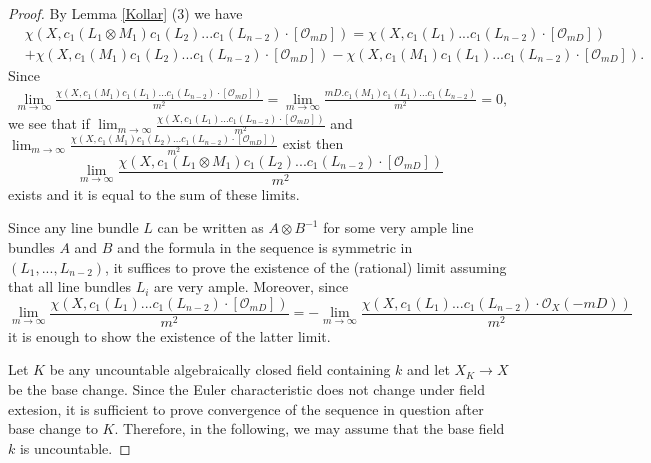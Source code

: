 \documentclass[twoside, 11pt]{article}
\theoremstyle{plain}
\theoremstyle{definition}
\theoremstyle{remark}
\newcommand{\cO}{{\mathcal O}}
\begin{document}
\begin{proof}
 By Lemma \ref{Kollar} (3) we have
\begin{align*}
&{  \chi (X, c_1(L_1\otimes M_1)c_1(L_2)...c_1(L_{n-2}) \cdot [\cO_{mD}] ) }
={  \chi (X, c_1(L_1)...c_1(L_{n-2}) \cdot [\cO_{mD}] ) }\\
&+ {  \chi (X, c_1(M_1)c_1(L_2)...c_1(L_{n-2}) \cdot [\cO_{mD}] ) }- 
 {  \chi (X, c_1(M_1)c_1(L_1)...c_1(L_{n-2}) \cdot [\cO_{mD}] ) }.
\end{align*}
Since
\begin{align*}
\lim _{m\to \infty}\frac{\chi (X,  c_1(M_1)c_1(L_1)...c_1(L_{n-2}) \cdot [\cO_{mD}])}{m^2}
=\lim _{m\to \infty}\frac{m D.  c_1(M_1)c_1(L_1)...c_1(L_{n-2} )}{m^2}=0,
\end{align*}
we see that if  $\lim _{m\to \infty }\frac {  \chi (X, c_1(L_1)...c_1(L_{n-2}) \cdot [\cO_{mD}] ) }{m^2} $ and 
$\lim _{m\to \infty }\frac {  \chi (X, c_1(M_1)c_1(L_2)...c_1(L_{n-2}) \cdot [\cO_{mD}] ) }{m^2}$
exist then $$\lim _{m\to \infty }\frac {  \chi (X, c_1(L_1\otimes M_1)c_1(L_2)...c_1(L_{n-2}) \cdot [\cO_{mD}] ) }{m^2}$$
exists and it is equal to the sum of these limits.

Since any line bundle $L$ can be written as $A\otimes B^{-1}$ for some very ample line bundles $A$ and $B$ and the formula in the sequence is symmetric in $(L_1, ..., L_{n-2})$, it suffices to prove the existence of the (rational) limit assuming that all line bundles $L_i$ are very ample. Moreover, since 
$$\lim _{m\to \infty } \frac {  \chi (X, c_1(L_1)...c_1(L_{n-2}) \cdot [\cO_{mD} ]) }{m^2}=
-\lim _{m\to \infty }\frac {  \chi (X, c_1(L_1)...c_1(L_{n-2}) \cdot \cO_X (-mD)) }{m^2}
$$
it is enough to show the existence of the latter limit.


Let $K$ be any uncountable algebraically closed field containing $k$ and let $X_K\to X$ be the base change. Since the
Euler characteristic does not change under field extesion, it is sufficient to prove convergence of the sequence in question after base change to $K$. Therefore, in the following, we may assume that the base field $k$ is uncountable. 


\end{proof}
\end{document}
